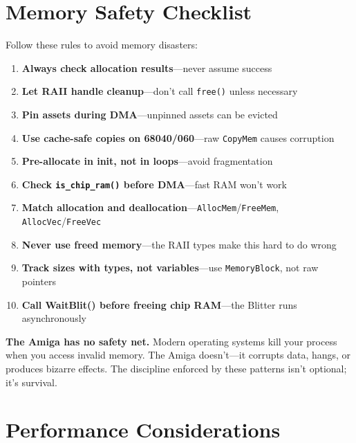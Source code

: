 \section{Memory Safety Checklist}
\label{sec:memory-checklist}

Follow these rules to avoid memory disasters:

\begin{enumerate}
    \item \textbf{Always check allocation results}---never assume success
    \item \textbf{Let RAII handle cleanup}---don't call \texttt{free()} unless necessary
    \item \textbf{Pin assets during DMA}---unpinned assets can be evicted
    \item \textbf{Use cache-safe copies on 68040/060}---raw \texttt{CopyMem} causes corruption
    \item \textbf{Pre-allocate in init, not in loops}---avoid fragmentation
    \item \textbf{Check \texttt{is\_chip\_ram()} before DMA}---fast RAM won't work
    \item \textbf{Match allocation and deallocation}---\texttt{AllocMem}/\texttt{FreeMem}, \texttt{AllocVec}/\texttt{FreeVec}
    \item \textbf{Never use freed memory}---the RAII types make this hard to do wrong
    \item \textbf{Track sizes with types, not variables}---use \texttt{MemoryBlock}, not raw pointers
    \item \textbf{Call WaitBlit() before freeing chip RAM}---the Blitter runs asynchronously
\end{enumerate}

\begin{warningbox}
\textbf{The Amiga has no safety net.} Modern operating systems kill your process when you access invalid memory. The Amiga doesn't---it corrupts data, hangs, or produces bizarre effects. The discipline enforced by these patterns isn't optional; it's survival.
\end{warningbox}

\section{Performance Considerations}
\label{sec:memory-performance}

